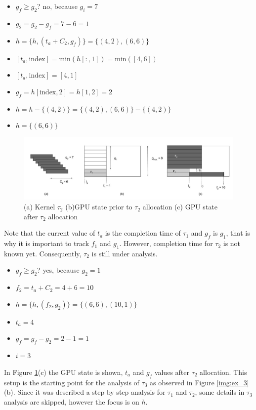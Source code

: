 \documentclass[
  12pt,
  a4paperpaper,
]{report}
\providecommand{\tightlist}{%
  \setlength{\itemsep}{0pt}\setlength{\parskip}{0pt}}
\begin{document}
\begin{itemize}
\tightlist
\item
  \(g_f \geq g_2\)? no, because \(g_i = 7\)
\item
  \(g_2 = g_2 - g_f = 7-6 = 1\)
\item
  \(h = \{h, (t_a + C_2, g_f)\} = \{ (4,2), (6,6) \}\)
\item
  \([ t_a, \mathrm{index} ] = \mathrm{min}(h[:,1]) = \mathrm{min}([4,6])\)
\item
  \([ t_a, \mathrm{index} ] = [4,1]\)
\item
  \(g_f = h[ \mathrm{index},2] = h[1,2] = 2\)
\item
  \(h = h - \{ (4,2) \} = \{ (4,2), (6,6) \} - \{ (4,2) \}\)
\item
  \(h = \{(6,6)\}\)
\end{itemize}

\begin{figure}
\centering
\includegraphics{source/figures/ex_2.jpg}
\caption{(a) Kernel \(\tau_2\) (b)GPU state prior to \(\tau_2\)
allocation (c) GPU state after \(\tau_2\) allocation \label{img:ex_2}}
\end{figure}

Note that the current value of \(t_a\) is the completion time of \(\tau_1\) and
\(g_f\) is \(g_1\), that is why it is important to
track \(f_1\) and \(g_1\). However, completion time for \(\tau_2\) is
not known yet. Consequently, \(\tau_2\) is still under analysis.

\begin{itemize}
\tightlist
\item
  \(g_f \geq g_2\)? yes, because \(g_2 = 1\)
\item
  \(f_2 = t_a + C_2 = 4 + 6 = 10\)
\item
  \(h = \{h, (f_2, g_2)\} = \{ (6,6),(10,1) \}\)
\item
  \(t_a = 4\)
\item
  \(g_f = g_f - g_2 = 2 - 1 = 1\)
\item
  \(i = 3\)
\end{itemize}

In Figure \ref{img:ex_2}(c) the GPU state is shown, \(t_a\) and \(g_f\)
values after \(\tau_2\) allocation. This setup is the starting point for
the analysis of \(\tau_3\) as observed in Figure \ref{img:ex_3}(b).
Since it was described a step by step analysis for \(\tau_1\) and
\(\tau_2\), some details in \(\tau_3\) analysis are skipped, however the focus is on \(h\).
\end{document}
